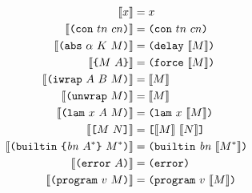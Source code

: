 \documentclass[../plutus-core-specification.tex]{subfiles}
\begin{document}
\begin{minipage}{\linewidth}
    \centering
    \begin{align*}%
       \erase{x}                      &= x                            \\
       \erase{\con{tn}{cn}}           &= \con{tn}{cn}                 \\
       \erase{\abs{\alpha}{K}{M}}     &= \delay{\erase{M}}            \\
       \erase{\inst{M}{A}}            &= \force{\erase{M}}            \\
       \erase{\iwrap{A}{B}{M}}        &= \erase{M}                    \\
       \erase{\unwrap{M}}             &= \erase{M}                    \\
       \erase{\lam{x}{A}{M}}          &= \lamU{x}{\erase{M}}          \\
       \erase{\app{M}{N}}             &= \appU{\erase{M}}{\erase{N}}  \\
       \erase{\builtin{bn}{A^*}{M^*}} &= \builtinU{bn}{\erase{M^*}}    \\
       \erase{\error{A}}              &= \errorU{}                     \\
       \erase{\version{v}{M}}        &= \version{v}{\erase{M}}
    \end{align*}
    \label{fig:type-erasure}
\end{minipage}
\end{document}
